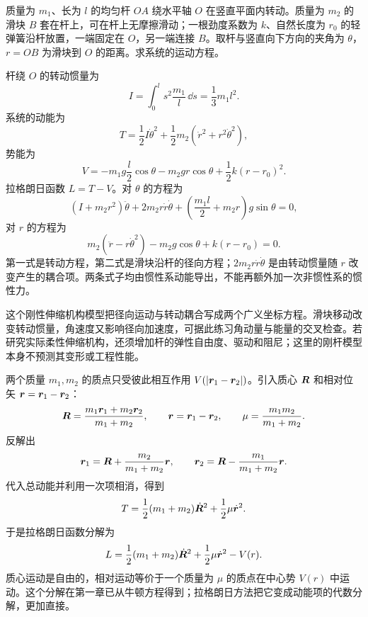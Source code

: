 \begin{example}[旋转杆上的滑块与弹簧]
质量为 $m_1$、长为 $l$ 的均匀杆 $OA$ 绕水平轴 $O$ 在竖直平面内转动。质量为 $m_2$ 的滑块 $B$ 套在杆上，可在杆上无摩擦滑动；一根劲度系数为 $k$、自然长度为 $r_0$ 的轻弹簧沿杆放置，一端固定在 $O$，另一端连接 $B$。取杆与竖直向下方向的夹角为 $\theta$，$r=OB$ 为滑块到 $O$ 的距离。求系统的运动方程。

\begin{center}
\end{center}

杆绕 $O$ 的转动惯量为
\[
I=\int_0^l s^2\frac{m_1}{l}\,\dd s=\frac13m_1l^2.
\]
系统的动能为
\[
T=\frac12I\dot\theta^2+\frac12m_2\left(\dot r^2+r^2\dot\theta^2\right),
\]
势能为
\[
V=-m_1g\frac l2\cos\theta-m_2gr\cos\theta+\frac12k(r-r_0)^2.
\]
拉格朗日函数 $L=T-V$。对 $\theta$ 的方程为
\[
\left(I+m_2r^2\right)\ddot\theta+2m_2r\dot r\dot\theta
+\left(\frac{m_1l}{2}+m_2r\right)g\sin\theta=0,
\]
对 $r$ 的方程为
\[
m_2\left(\ddot r-r\dot\theta^2\right)-m_2g\cos\theta
+k(r-r_0)=0.
\]
第一式是转动方程，第二式是滑块沿杆的径向方程；$2m_2r\dot r\dot\theta$ 是由转动惯量随 $r$ 改变产生的耦合项。两条式子均由惯性系动能导出，不能再额外加一次非惯性系的惯性力。

\begin{modernbox}
这个刚性伸缩机构模型把径向运动与转动耦合写成两个广义坐标方程。滑块移动改变转动惯量，角速度又影响径向加速度，可据此练习角动量与能量的交叉检查。若研究实际柔性伸缩机构，还须增加杆的弹性自由度、驱动和阻尼；这里的刚杆模型本身不预测其变形或工程性能。
\end{modernbox}
\end{example}

\begin{example}[两体问题的约化]
两个质量 $m_1,m_2$ 的质点只受彼此相互作用 $V(|\boldsymbol{r}_1-\boldsymbol{r}_2|)$。引入质心 $\boldsymbol{R}$ 和相对位矢 $\boldsymbol{r}=\boldsymbol{r}_1-\boldsymbol{r}_2$：
\[
\boldsymbol{R}=\frac{m_1\boldsymbol{r}_1+m_2\boldsymbol{r}_2}{m_1+m_2},
\qquad
\boldsymbol{r}=\boldsymbol{r}_1-\boldsymbol{r}_2,
\qquad
\mu=\frac{m_1m_2}{m_1+m_2}.
\]
反解出
\[
\boldsymbol{r}_1=\boldsymbol{R}+\frac{m_2}{m_1+m_2}\boldsymbol{r},
\qquad
\boldsymbol{r}_2=\boldsymbol{R}-\frac{m_1}{m_1+m_2}\boldsymbol{r}.
\]
代入总动能并利用一次项相消，得到
\[
T=\frac12(m_1+m_2)\dot{\boldsymbol{R}}^2+\frac12\mu\dot{\boldsymbol{r}}^2.
\]
于是拉格朗日函数分解为
\[
L=\frac12(m_1+m_2)\dot{\boldsymbol{R}}^2
+\frac12\mu\dot{\boldsymbol{r}}^2-V(r).
\]
质心运动是自由的，相对运动等价于一个质量为 $\mu$ 的质点在中心势 $V(r)$ 中运动。这个分解在第一章已从牛顿方程得到；拉格朗日方法把它变成动能项的代数分解，更加直接。
\end{example}

